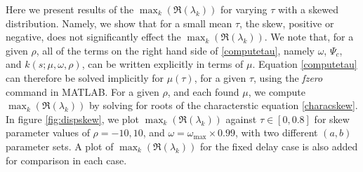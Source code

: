 Here we present results of the $\max_k(\Re(\lambda_k))$ for varying $\tau$ with a skewed distribution. Namely, we show that for a small mean $\tau$, the skew, positive or negative, does not significantly effect the $\max_k(\Re(\lambda_k))$. We note that, for a given $\rho$, all of the terms on the right hand side of \eqref{computetau}, namely $\omega$, $\Psi_c$,  and $k(s;\mu,\omega,\rho)$, can be written explicitly in terms of $\mu$. Equation \eqref{computetau} can therefore be solved implicitly for $\mu(\tau)$, for a given $\tau$, using the \textit{fzero} command in MATLAB. For a given $\rho$, and each found $\mu$, we compute $\max_k(\Re(\lambda_k))$ by solving for roots of the characterstic equation \eqref{characskew}. In figure \ref{fig:dispskew}, we plot $\max_k(\Re(\lambda_k))$ against $\tau\in[0,0.8]$ for skew parameter values of $\rho=-10,10$, and $\omega=\omega_{\max}\times0.99$, with two different $(a,b)$ parameter sets. A plot of $\max_k(\Re(\lambda_k))$ for the fixed delay case is also added for comparison in each case.

